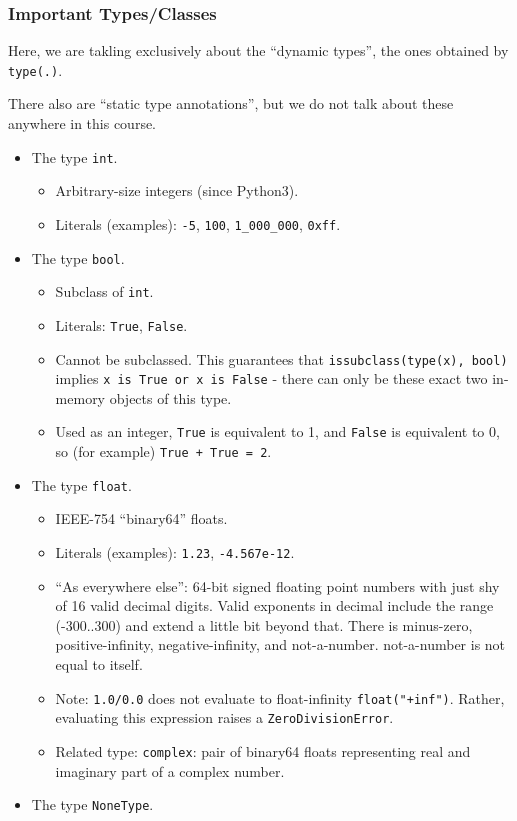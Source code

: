\documentclass[11pt]{article}
\providecommand{\tightlist}{%
      \setlength{\itemsep}{0pt}\setlength{\parskip}{0pt}}
\begin{document}
\hypertarget{important-typesclasses}{%
\subsubsection{Important Types/Classes}\label{important-typesclasses}}

Here, we are takling exclusively about the ``dynamic types'', the ones
obtained by \texttt{type(.)}.

There also are ``static type annotations'', but we do not talk about
these anywhere in this course.

\begin{itemize}
\tightlist
\item
  The type \texttt{int}.

  \begin{itemize}
  \tightlist
  \item
    Arbitrary-size integers (since Python3).
  \item
    Literals (examples): \texttt{-5}, \texttt{100},
    \texttt{1\_000\_000}, \texttt{0xff}.
  \end{itemize}
\item
  The type \texttt{bool}.

  \begin{itemize}
  \tightlist
  \item
    Subclass of \texttt{int}.
  \item
    Literals: \texttt{True}, \texttt{False}.
  \item
    Cannot be subclassed. This guarantees that
    \texttt{issubclass(type(x),\ bool)} implies
    \texttt{x\ is\ True\ or\ x\ is\ False} - there can only be these
    exact two in-memory objects of this type.
  \item
    Used as an integer, \texttt{True} is equivalent to 1, and
    \texttt{False} is equivalent to 0, so (for example)
    \texttt{True\ +\ True\ =\ 2}.
  \end{itemize}
\item
  The type \texttt{float}.

  \begin{itemize}
  \tightlist
  \item
    IEEE-754 ``binary64'' floats.
  \item
    Literals (examples): \texttt{1.23}, \texttt{-4.567e-12}.
  \item
    ``As everywhere else'': 64-bit signed floating point numbers with
    just shy of 16 valid decimal digits. Valid exponents in decimal
    include the range (-300..300) and extend a little bit beyond that.
    There is minus-zero, positive-infinity, negative-infinity, and
    not-a-number. not-a-number is not equal to itself.
  \item
    Note: \texttt{1.0/0.0} does not evaluate to float-infinity
    \texttt{float("+inf")}. Rather, evaluating this expression raises a
    \texttt{ZeroDivisionError}.
  \item
    Related type: \texttt{complex}: pair of binary64 floats representing
    real and imaginary part of a complex number.
  \end{itemize}
\item
  The type \texttt{NoneType}.


\end{itemize}
\end{document}
